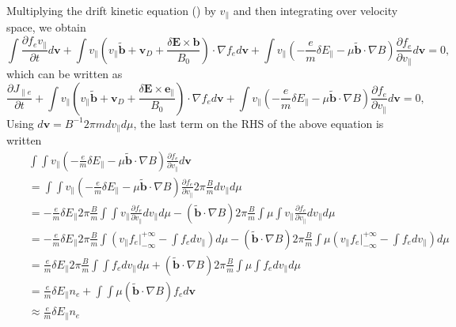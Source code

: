 \documentclass{llncs}
\newcommand{\nobracket}{}
\begin{document}
Multiplying the drift kinetic equation () by $v_{\parallel}$ and then
integrating over velocity space, we obtain
\begin{equation}
  \int \frac{\partial f_e v_{\parallel}}{\partial t} d\mathbf{v}+ \int
  v_{\parallel} \left( v_{\parallel} \tilde{\mathbf{b}} +\mathbf{v}_D +
  \frac{\delta \mathbf{E} \times \mathbf{b}}{B_0} \right) \cdot \nabla f_e
  d\mathbf{v}+ \int v_{\parallel} \left( - \frac{e}{m} \delta E_{\parallel} -
  \mu \tilde{\mathbf{b}} \cdot \nabla B \right) \frac{\partial f_e}{\partial
  v_{\parallel}} d\mathbf{v}= 0,
\end{equation}
which can be written as
\begin{equation}
  \frac{\partial J_{\parallel e}}{\partial t} + \int v_{\parallel} \left(
  v_{\parallel} \tilde{\mathbf{b}} +\mathbf{v}_D + \frac{\delta \mathbf{E}
  \times \mathbf{e}_{\parallel}}{B_0} \right) \cdot \nabla f_e d\mathbf{v}+
  \int v_{\parallel} \left( - \frac{e}{m} \delta E_{\parallel} - \mu
  \tilde{\mathbf{b}} \cdot \nabla B \right) \frac{\partial f_e}{\partial
  v_{\parallel}} d\mathbf{v}= 0,
\end{equation}
Using $d\mathbf{v}= B^{- 1} 2 \pi m d v_{\parallel} d \mu$, the last term on
the RHS of the above equation is written
\begin{eqnarray}
  &  & \int \int v_{\parallel} \left( - \frac{e}{m} \delta E_{\parallel} -
  \mu \tilde{\mathbf{b}} \cdot \nabla B \right) \frac{\partial f_e}{\partial
  v_{\parallel}} d\mathbf{v} \nonumber\\
  &  & = \int \int v_{\parallel} \left( - \frac{e}{m} \delta E_{\parallel} -
  \mu \tilde{\mathbf{b}} \cdot \nabla B \right) \frac{\partial f_e}{\partial
  v_{\parallel}} 2 \pi \frac{B}{m} d v_{\parallel} d \mu \nonumber\\
  &  & = - \frac{e}{m} \delta E_{\parallel} 2 \pi \frac{B}{m} \int \int
  v_{\parallel} \frac{\partial f_e}{\partial v_{\parallel}} d v_{\parallel} d
  \mu - (\tilde{\mathbf{b}} \cdot \nabla B) 2 \pi \frac{B}{m} \int \mu \int
  v_{\parallel} \frac{\partial f_e}{\partial v_{\parallel}} d v_{\parallel} d
  \mu \nonumber\\
  &  & = - \frac{e}{m} \delta E_{\parallel} 2 \pi \frac{B}{m} \int \left(
  v_{\parallel} f_e |_{- \infty}^{+ \infty} \nobracket - \int f_e d
  v_{\parallel} \right) d \mu - (\tilde{\mathbf{b}} \cdot \nabla B) 2 \pi
  \frac{B}{m} \int \mu \left( v_{\parallel} f_e |_{- \infty}^{+ \infty}
  \nobracket - \int f_e d v_{\parallel} \right) d \mu \nonumber\\
  &  & = \frac{e}{m} \delta E_{\parallel} 2 \pi \frac{B}{m} \int \int f_e d
  v_{\parallel} d \mu + (\tilde{\mathbf{b}} \cdot \nabla B) 2 \pi \frac{B}{m}
  \int \mu \int f_e d v_{\parallel} d \mu \nonumber\\
  &  & = \frac{e}{m} \delta E_{\parallel} n_e + \int \int \mu
  (\tilde{\mathbf{b}} \cdot \nabla B) f_e d\mathbf{v} \\
  &  & \approx \frac{e}{m} \delta E_{\parallel} n_e \nonumber
\end{eqnarray}
\end{document}
